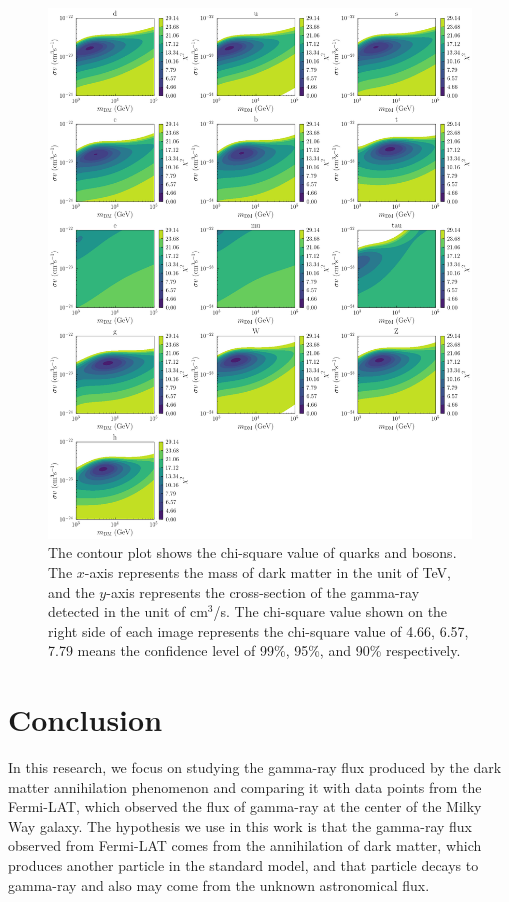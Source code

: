 \documentclass[10pt, oneside]{book}
\numberwithin{equation}{chapter}
\begin{document}
\begin{figure}
    \centering
    \includegraphics[width=\linewidth]{images/Contour_Best_Fit_not_all_3.png}
    \caption{The contour plot shows the chi-square value of quarks and bosons. The $x$-axis represents the mass of dark matter in the unit of TeV, and the $y$-axis represents the cross-section of the gamma-ray detected in the unit of cm$^3$/s. The chi-square value shown on the right side of each image represents the chi-square value of 4.66, 6.57, 7.79 means the confidence level of 99\%, 95\%, and 90\% respectively.}
    \label{fig: contour unknown astronomy flux}
\end{figure}


\chapter{Conclusion}
In this research, we focus on studying the gamma-ray flux produced by the dark matter annihilation phenomenon and comparing it with data points from the Fermi-LAT, which observed the flux of gamma-ray at the center of the Milky Way galaxy. The hypothesis we use in this work is that the gamma-ray flux observed from Fermi-LAT comes from the annihilation of dark matter, which produces another particle in the standard model, and that particle decays to gamma-ray and also may come from the unknown astronomical flux.
\end{document}
